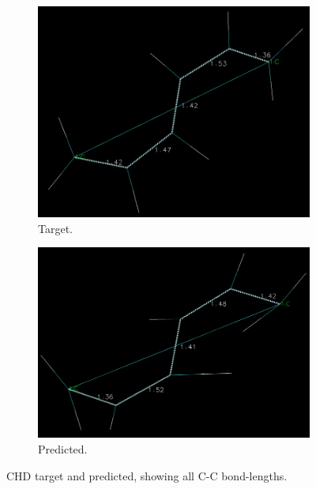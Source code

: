 \documentclass[]{article}
\begin{document}
	\begin{figure}[H]
	\centering

		\begin{subfigure}{0.6\textwidth}
			\includegraphics[width=\textwidth]{target_step48.png}
			\caption{Target.}
			\label{fig:chd_target}
		\end{subfigure}
	\hfill
		\begin{subfigure}{0.6\textwidth}
			\includegraphics[width=\textwidth]{1003.png}
			\caption{Predicted.}
			\label{fig:chd_predicted}
		\end{subfigure}
	\caption{CHD target and predicted, showing all C-C bond-lengths.}
	\label{fig:figures}
	\end{figure}



	
\end{document}
